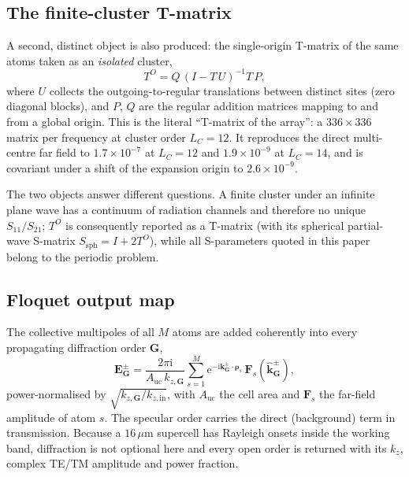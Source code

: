 \documentclass[11pt,a4paper]{article}
\newcommand{\um}{\ensuremath{\,\mu\mathrm{m}}}
\newcommand{\Gvec}{\ensuremath{\mathbf{G}}}
\newcommand{\rhovec}{\ensuremath{\boldsymbol{\rho}}}
\theoremstyle{plain}
\theoremstyle{definition}
\begin{document}
\subsection{The finite-cluster T-matrix}

A second, distinct object is also produced: the single-origin T-matrix of the
same atoms taken as an \emph{isolated} cluster,
\begin{equation}
  T^{O} = Q\,\left(I - T\,U\right)^{-1} T\,P ,
  \label{eq:cluster}
\end{equation}
where $U$ collects the outgoing-to-regular translations between distinct sites
(zero diagonal blocks), and $P$, $Q$ are the regular addition matrices mapping to
and from a global origin. This is the literal ``T-matrix of the array'': a
$336 \times 336$ matrix per frequency at cluster order $L_C = 12$. It reproduces
the direct multi-centre far field to $1.7\times10^{-7}$ at $L_C = 12$ and
$1.9\times10^{-9}$ at $L_C = 14$, and is covariant under a shift of the expansion
origin to $2.6\times10^{-9}$.

The two objects answer different questions. A finite cluster under an infinite
plane wave has a continuum of radiation channels and therefore no unique
$S_{11}/S_{21}$; $T^{O}$ is consequently reported as a T-matrix (with its
spherical partial-wave S-matrix $S_{\mathrm{sph}} = I + 2T^{O}$), while all
S-parameters quoted in this paper belong to the periodic problem.

\subsection{Floquet output map}

The collective multipoles of all $M$ atoms are added coherently into every
propagating diffraction order $\Gvec$,
\begin{equation}
  \mathbf{E}^{\pm}_{\Gvec}
    = \frac{2\pi\mathrm{i}}{A_{\text{uc}}\,k_{z,\Gvec}}
      \sum_{s=1}^{M}
      \mathrm{e}^{-\mathrm{i}\mathbf{k}^{\pm}_{\Gvec}\cdot\rhovec_s}\,
      \mathbf{F}_s\!\left(\hat{\mathbf{k}}^{\pm}_{\Gvec}\right),
  \label{eq:floquet}
\end{equation}
power-normalised by $\sqrt{k_{z,\Gvec}/k_{z,\text{in}}}$, with $A_{\text{uc}}$
the cell area and $\mathbf{F}_s$ the far-field amplitude of atom $s$. The
specular order carries the direct (background) term in transmission. Because a
$16\um$ supercell has Rayleigh onsets inside the working band, diffraction is not
optional here and every open order is returned with its $k_z$, complex TE/TM
amplitude and power fraction.
\end{document}

